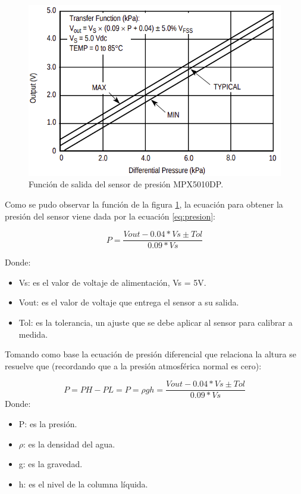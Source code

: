 \begin{figure}[h]
\centering
\includegraphics[scale=.55]{./Figures/SalidaMPX5010DP.png}
\caption{Función de salida del sensor de presión MPX5010DP.}
\label{fig:función de salida del sensor}
\end{figure}
Como se pudo observar la función de la figura \ref{fig:función de salida del sensor}, la ecuación para obtener la presión del sensor viene dada por la ecuación \ref{eq:presion}:

\begin{equation}
 \label{eq:presion}
 P = \frac{Vout- 0.04*Vs \pm Tol}{0.09*Vs}
\end{equation}

\vspace{3cm}
Donde:\\
\begin{itemize}
\item Vs: es el valor de voltaje de alimentación, Vs = 5V.\\
\item Vout: es el valor de voltaje que entrega el sensor  a su salida.\\
\item Tol: es la tolerancia, un ajuste que se debe aplicar al sensor para  calibrar a medida.
\end{itemize}

Tomando como base la ecuación de presión diferencial que relaciona la altura se resuelve que (recordando que a la presión atmosférica normal es cero):  

\begin{equation}
 \label{eq:presiónII}
	 P =PH -PL= P = \rho gh =\frac{Vout- 0.04*Vs \pm Tol}{0.09*Vs}	
\end{equation}
 Donde:
 \begin{itemize}
 \item P: es la presión.
 \item $\rho$: es la densidad del agua.
 \item g: es la gravedad.
 \item h: es el nivel de la columna líquida.
 \end{itemize}
 

